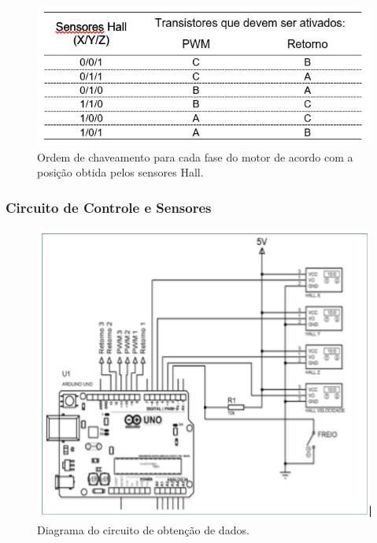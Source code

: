 			\graphicspath{{figuras/}}
			\begin{figure}[h!]
				\centering
				\includegraphics[scale=0.80]{Tabela2_Ordem_de_chaveamento_Hall.png}
				\caption{Ordem de chaveamento para cada fase do motor de acordo com a posição obtida pelos sensores Hall.}
				\label{img:Ordem_de_chaveamento_para_cada_fase_do_motor_de_acordo_com_a_posição_obtida_pelos_sensores_Hall}
			\end{figure}
		
		\newpage
		
		\subsubsection{Circuito de Controle e Sensores}
		
			\graphicspath{{figuras/}}
			\begin{figure}[h!]
				\centering
				\includegraphics[scale=0.80]{Figura13_circuito_de_obtencao_de_dados.PNG}
				\caption{Diagrama do circuito de obtenção de dados.}
				\label{img:Diagrama_do_circuito_de_obtencao_de_dados}
			\end{figure}
%		
		


